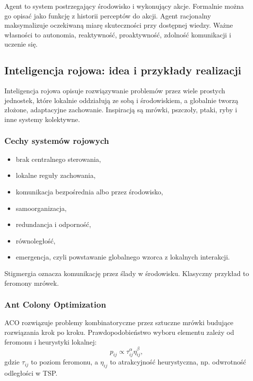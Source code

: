 Agent to system postrzegający środowisko i wykonujący akcje. Formalnie można go opisać jako funkcję z historii perceptów do akcji. Agent racjonalny maksymalizuje oczekiwaną miarę skuteczności przy dostępnej wiedzy. Ważne własności to autonomia, reaktywność, proaktywność, zdolność komunikacji i uczenie się.

\subsection{Inteligencja rojowa: idea i przykłady realizacji}

Inteligencja rojowa opisuje rozwiązywanie problemów przez wiele prostych jednostek, które lokalnie oddziałują ze sobą i środowiskiem, a globalnie tworzą złożone, adaptacyjne zachowanie. Inspiracją są mrówki, pszczoły, ptaki, ryby i inne systemy kolektywne.

\subsubsection{Cechy systemów rojowych}

\begin{itemize}
  \item brak centralnego sterowania,
  \item lokalne reguły zachowania,
  \item komunikacja bezpośrednia albo przez środowisko,
  \item samoorganizacja,
  \item redundancja i odporność,
  \item równoległość,
  \item emergencja, czyli powstawanie globalnego wzorca z lokalnych interakcji.
\end{itemize}

Stigmergia oznacza komunikację przez ślady w środowisku. Klasyczny przykład to feromony mrówek.

\subsubsection{Ant Colony Optimization}

ACO rozwiązuje problemy kombinatoryczne przez sztuczne mrówki budujące rozwiązania krok po kroku. Prawdopodobieństwo wyboru elementu zależy od feromonu i heurystyki lokalnej:
\[
p_{ij}\propto \tau_{ij}^{\alpha}\eta_{ij}^{\beta},
\]
gdzie $\tau_{ij}$ to poziom feromonu, a $\eta_{ij}$ to atrakcyjność heurystyczna, np. odwrotność odległości w TSP.

